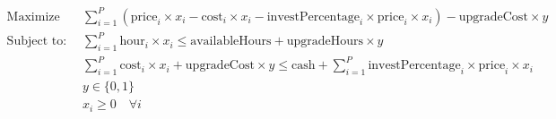 \documentclass{article}
\begin{document}
\newcommand{\cash}{\text{cash}}
\newcommand{\hours}{\text{hour}_i}
\newcommand{\cost}{\text{cost}_i}
\newcommand{\price}{\text{price}_i}
\newcommand{\investPercentage}{\text{investPercentage}_i}
\newcommand{\upgradeHours}{\text{upgradeHours}}
\newcommand{\upgradeCost}{\text{upgradeCost}}
\newcommand{\availableHours}{\text{availableHours}}


\begin{align*}
\text{Maximize} \quad & \sum_{i=1}^{P} \left(\text{price}_i \times x_i - \text{cost}_i \times x_i - \text{investPercentage}_i \times \text{price}_i \times x_i\right) - \text{upgradeCost} \times y \\
\text{Subject to:} \quad & \sum_{i=1}^{P} \text{hour}_i \times x_i \leq \text{availableHours} + \text{upgradeHours} \times y \\
& \sum_{i=1}^{P} \text{cost}_i \times x_i + \text{upgradeCost} \times y \leq \text{cash} + \sum_{i=1}^{P} \text{investPercentage}_i \times \text{price}_i \times x_i \\
& y \in \{0, 1\} \\
& x_i \geq 0 \quad \forall i
\end{align*}

\end{document}
